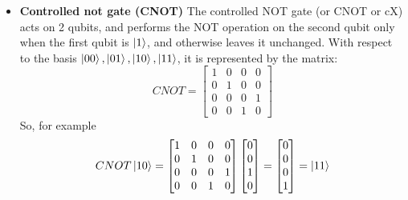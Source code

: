 \documentclass[main.tex]{subfiles}
\begin{document}
	\begin{itemize}
	\item \textbf{Controlled not gate (CNOT)} The 
	controlled NOT gate (or CNOT or cX) acts on 2 qubits, and performs the NOT operation on the 
	second qubit only when the first qubit is $\ket{1}$, and otherwise leaves 
	it unchanged. With respect to the basis $\ket{00}, \ket{01}, \ket{10}, \ket{11}$, it is 
	represented by the matrix:
	\begin{equation}
	CNOT=
	\begin{bmatrix}
	1 & 0 & 0 & 0\\
	0 & 1 & 0 & 0\\
	0 & 0 & 0 & 1\\
	0 & 0 & 1 & 0
	\end{bmatrix}
	\end{equation}
	So, for example
	$$
	CNOT\ket{10}=
	\begin{bmatrix}
	1 & 0 & 0 & 0\\
	0 & 1 & 0 & 0\\
	0 & 0 & 0 & 1\\
	0 & 0 & 1 & 0
	\end{bmatrix}
	\begin{bmatrix}
	0 \\
	0 \\
	1 \\
	0
	\end{bmatrix}
	= 
	\begin{bmatrix}
	0 \\
	0 \\
	0 \\
	1
	\end{bmatrix}
	=
	\ket{11}
	$$\\
	

\end{itemize}
\end{document}
